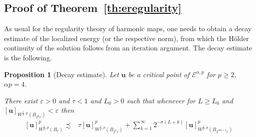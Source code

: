 \documentclass[a4paper,10pt,intlimits,ngerman]{amsart}
\newcommand{\iv}{B} %
\newtheorem{proposition}[theorem]{Proposition}
\numberwithin{equation}{section}
\newcommand{\solu}{{\boldsymbol{u}}}
\newcommand{\aleq}{\precsim}
\newcommand{\eps}{\varepsilon}
\begin{document}
\subsection{Proof of Theorem~\ref{th:eregularity}}
As usual for the regularity theory of harmonic maps, one needs to obtain a decay estimate of the localized energy (or the respective norm), from which the H\"older continuity of the solution follows from an iteration argument. The decay estimate is the following.
\begin{proposition}[Decay estimate]\label{pr:decay}
Let $\solu$ be a critical point of $\mathcal{E}^{\alpha,p}$ for $p \geq 2$, $\alpha p = 4$.

There exist $\eps > 0$ and $\tau < 1$ and $L_0 > 0$ such that whenever for $L \geq L_0$ and $[\solu]_{W^{\frac{1}{p},p}(\iv_{2^Lr})} < \eps$ then
\[
\begin{split}
[\solu]_{W^{\frac{1}{p},p}(\iv_r)}^p \aleq & \tau [\solu]_{W^{\frac{1}{p},p}(\iv_{2^L r})}^{p}
% 
+ \sum_{k=1}^\infty 2^{-\sigma(L+k)} [\solu]_{W^{\frac{1}{p},p}(\iv_{2^{20L+k}r})}^{p}
\end{split}
\]
\end{proposition}
\end{document}
